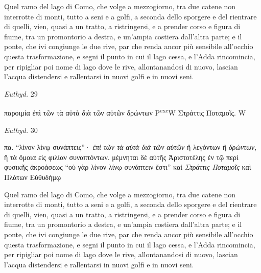 \documentclass[11pt,a4paper]{book}
\begin{document}
Quel ramo del lago di Como, che volge a mezzogiorno, tra due catene non interrotte di monti, tutto a seni e a golfi, a seconda dello sporgere e del rientrare di quelli, vien, quasi a un tratto, a ristringersi, e a prender corso e figura di fiume, tra un promontorio a destra, e un’ampia costiera dall’altra parte; e il ponte, che ivi congiunge le due rive, par che renda ancor più sensibile all’occhio questa trasformazione, e segni il punto in cui il lago cessa, e l’Adda rincomincia, per ripigliar poi nome di lago dove le rive, allontanandosi di nuovo, lascian l’acqua distendersi e rallentarsi in nuovi golfi e in nuovi seni.

\smallskip
\begin{small}
\numberlinefalse
\begin{pairs}
	\begin{Leftside}
	\beginnumbering
	\pstart
	\centerline{\textit{Euthyd.} 29}
	\pend
	\pstart
	\noindent\textgreek{παροιμία ἐπὶ τῶν τὰ αὐτὰ διὰ τῶν αὐτῶν δρώντων} P\textsuperscript{exc}W
	\pend
	\pstart
	\noindent\textgreek{Στράττις Ποταμοῖς}. W
	\pend
	\endnumbering
	\end{Leftside}

	\begin{Rightside}
	\beginnumbering
	\pstart
	\centerline{\textit{Euthyd.} 30}
	\pend
	\pstart
	\noindent\textgreek{πα. “λίνον λίνῳ συνάπτεις”· \textit{ἐπὶ τῶν τὰ αὐτὰ διὰ τῶν αὐτῶν} ἢ λεγόντων ἢ \textit{δρώντων}, ἢ τὰ ὅμοια εἰς φιλίαν συναπτόντων. μέμνηται δὲ αὐτῆς Ἀριστοτέλης ἐν τῷ  περὶ φυσικῆς ἀκροάσεως “οὐ γὰρ λίνον λίνῳ συνάπτειν ἔστι”}
	\pend
	\pstart
	\noindent\textgreek{καὶ \textit{Στράττις Ποταμοῖς} καὶ Πλάτων Εὐθυδήμῳ}
	\pend
	\endnumbering
	\end{Rightside}
\end{pairs}
\Columns
\numberlinetrue
\end{small}
\smallskip

Quel ramo del lago di Como, che volge a mezzogiorno, tra due catene non interrotte di monti, tutto a seni e a golfi, a seconda dello sporgere e del rientrare di quelli, vien, quasi a un tratto, a ristringersi, e a prender corso e figura di fiume, tra un promontorio a destra, e un’ampia costiera dall’altra parte; e il ponte, che ivi congiunge le due rive, par che renda ancor più sensibile all’occhio questa trasformazione, e segni il punto in cui il lago cessa, e l’Adda rincomincia, per ripigliar poi nome di lago dove le rive, allontanandosi di nuovo, lascian l’acqua distendersi e rallentarsi in nuovi golfi e in nuovi seni.
\end{document}
